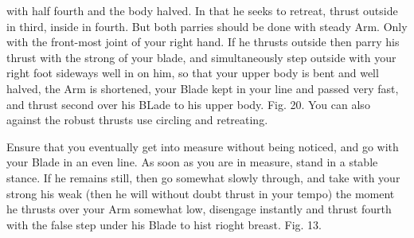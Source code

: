 \newpage


\newpage



with half fourth and the body halved. In that he seeks to retreat, thrust outside in third, inside in fourth. But both parries should be done with steady Arm. Only with the front-most joint of your right hand. If he thrusts outside then parry his thrust with the strong of your blade, and simultaneously step outside with your right foot sideways well in on him, so that your upper body is bent and well halved, the Arm is shortened, your Blade kept in your line and passed very fast, and thrust second over his BLade to his upper body. Fig. 20. You can also against the robust thrusts use circling and retreating.

\exercise{}


Ensure that you eventually get into measure without being noticed, and go with your Blade in an even line. As soon as you are in measure, stand in a stable stance. If he remains still, then go somewhat slowly through, and take with your strong his weak (then he will without doubt thrust in your tempo) the moment he thrusts over your Arm somewhat low, disengage instantly and thrust fourth with the false step under his Blade to hist rioght breast. Fig. 13.

